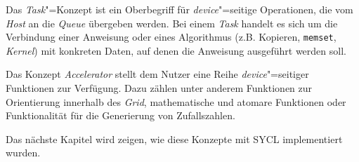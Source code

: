 Das \textit{Task}"=Konzept ist ein Oberbegriff für \textit{device}"=seitige
Operationen, die vom \textit{Host} an die \textit{Queue} übergeben werden. Bei
einem \textit{Task} handelt es sich um die Verbindung einer Anweisung oder eines
Algorithmus (z.B. Kopieren, \texttt{memset}, \textit{Kernel}) mit konkreten
Daten, auf denen die Anweisung ausgeführt werden soll.

Das Konzept \textit{Accelerator} stellt dem Nutzer eine Reihe
\textit{device}"=seitiger Funktionen zur Verfügung. Dazu zählen unter anderem
Funktionen zur Orientierung innerhalb des \textit{Grid}, mathematische und
atomare Funktionen oder Funktionalität für die Generierung von Zufallszahlen.

Das nächste Kapitel wird zeigen, wie diese Konzepte mit SYCL implementiert
wurden.

